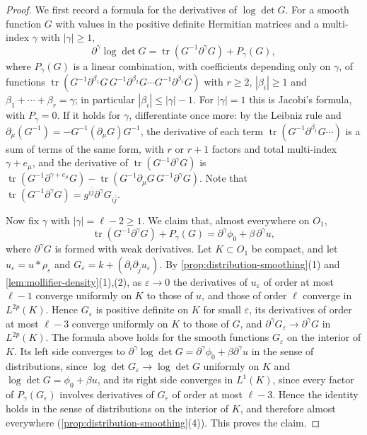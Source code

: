 \begin{proof}
We first record a formula for the derivatives of $\log\det G$. For a smooth function $G$ with values in the positive definite Hermitian matrices and a multi-index $\gamma$ with $|\gamma|\geq1$,
\[
 \partial^\gamma\log\det G=\operatorname{tr}(G^{-1}\partial^\gamma G)+P_\gamma(G),
\]
where $P_\gamma(G)$ is a linear combination, with coefficients depending only on $\gamma$, of functions $\operatorname{tr}(G^{-1}\partial^{\beta_1}G\,G^{-1}\partial^{\beta_2}G\cdots G^{-1}\partial^{\beta_r}G)$ with $r\geq2$, $|\beta_i|\geq1$ and $\beta_1+\cdots+\beta_r=\gamma$; in particular $|\beta_i|\leq|\gamma|-1$. For $|\gamma|=1$ this is Jacobi's formula, with $P_\gamma=0$. If it holds for $\gamma$, differentiate once more: by the Leibniz rule and $\partial_\mu(G^{-1})=-G^{-1}(\partial_\mu G)G^{-1}$, the derivative of each term $\operatorname{tr}(G^{-1}\partial^{\beta_1}G\cdots)$ is a sum of terms of the same form, with $r$ or $r+1$ factors and total multi-index $\gamma+e_\mu$, and the derivative of $\operatorname{tr}(G^{-1}\partial^\gamma G)$ is $\operatorname{tr}(G^{-1}\partial^{\gamma+e_\mu}G)-\operatorname{tr}(G^{-1}\partial_\mu G\,G^{-1}\partial^\gamma G)$. Note that $\operatorname{tr}(G^{-1}\partial^\gamma G)=g^{i\bar j}\partial^\gamma G_{i\bar j}$.

Now fix $\gamma$ with $|\gamma|=\ell-2\geq1$. We claim that, almost everywhere on $O_1$,
\[
 \operatorname{tr}(G^{-1}\partial^\gamma G)+P_\gamma(G)=\partial^\gamma\phi_0+\beta\,\partial^\gamma u,
\]
where $\partial^\gamma G$ is formed with weak derivatives. Let $K\subset O_1$ be compact, and let $u_\varepsilon=u*\rho_\varepsilon$ and $G_\varepsilon=k+(\partial_i\partial_{\bar j}u_\varepsilon)$. By \cref{prop:distribution-smoothing}(1) and \cref{lem:mollifier-density}(1),(2), as $\varepsilon\to0$ the derivatives of $u_\varepsilon$ of order at most $\ell-1$ converge uniformly on $K$ to those of $u$, and those of order $\ell$ converge in $L^{2p}(K)$. Hence $G_\varepsilon$ is positive definite on $K$ for small $\varepsilon$, its derivatives of order at most $\ell-3$ converge uniformly on $K$ to those of $G$, and $\partial^\gamma G_\varepsilon\to\partial^\gamma G$ in $L^{2p}(K)$. The formula above holds for the smooth functions $G_\varepsilon$ on the interior of $K$. Its left side converges to $\partial^\gamma\log\det G=\partial^\gamma\phi_0+\beta\partial^\gamma u$ in the sense of distributions, since $\log\det G_\varepsilon\to\log\det G$ uniformly on $K$ and $\log\det G=\phi_0+\beta u$, and its right side converges in $L^1(K)$, since every factor of $P_\gamma(G_\varepsilon)$ involves derivatives of $G_\varepsilon$ of order at most $\ell-3$. Hence the identity holds in the sense of distributions on the interior of $K$, and therefore almost everywhere (\cref{prop:distribution-smoothing}(4)). This proves the claim.


\end{proof}
